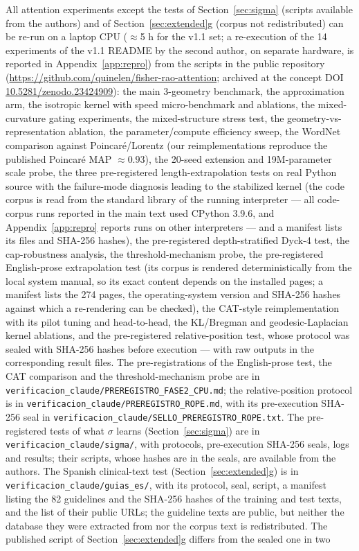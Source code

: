 \documentclass[11pt]{article}
\begin{document}
All attention experiments except the tests of Section~\ref{sec:sigma} (scripts available from the authors) and of Section~\ref{sec:extended}g (corpus not redistributed) can be re-run on a laptop CPU ($\approx$5 h for the v1.1 set; a re-execution of the 14 experiments of the v1.1 README by the second author, on separate hardware, is reported in Appendix~\ref{app:repro}) from the scripts in the public repository (\url{https://github.com/quinelen/fisher-rao-attention}; archived at the concept DOI \href{https://doi.org/10.5281/zenodo.23424909}{10.5281/zenodo.23424909}): the main 3-geometry benchmark, the approximation arm, the isotropic kernel with speed micro-benchmark and ablations, the mixed-curvature gating experiments, the mixed-structure stress test, the geometry-vs-representation ablation, the parameter/compute efficiency sweep, the WordNet comparison against Poincar\'e/Lorentz (our reimplementations reproduce the published Poincar\'e MAP $\approx 0.93$), the 20-seed extension and 19M-parameter scale probe, the three pre-registered length-extrapolation tests on real Python source with the failure-mode diagnosis leading to the stabilized kernel (the code corpus is read from the standard library of the running interpreter --- all code-corpus runs reported in the main text used CPython 3.9.6, and Appendix~\ref{app:repro} reports runs on other interpreters --- and a manifest lists its files and SHA-256 hashes), the pre-registered depth-stratified Dyck-4 test, the cap-robustness analysis, the threshold-mechanism probe, the pre-registered English-prose extrapolation test (its corpus is rendered deterministically from the local system manual, so its exact content depends on the installed pages; a manifest lists the 274 pages, the operating-system version and SHA-256 hashes against which a re-rendering can be checked), the CAT-style reimplementation with its pilot tuning and head-to-head, the KL/Bregman and geodesic-Laplacian kernel ablations, and the pre-registered relative-position test, whose protocol was sealed with SHA-256 hashes before execution --- with raw outputs in the corresponding result files. The pre-registrations of the English-prose test, the CAT comparison and the threshold-mechanism probe are in \texttt{verificacion\_claude/}\allowbreak\texttt{PREREGISTRO\_FASE2\_CPU.md}; the relative-position protocol is in \texttt{verificacion\_claude/}\allowbreak\texttt{PREREGISTRO\_ROPE.md}, with its pre-execution SHA-256 seal in \texttt{verificacion\_claude/}\allowbreak\texttt{SELLO\_PREREGISTRO\_ROPE.txt}. The pre-registered tests of what $\sigma$ learns (Section~\ref{sec:sigma}) are in \texttt{verificacion\_claude/}\allowbreak\texttt{sigma/}, with protocols, pre-execution SHA-256 seals, logs and results; their scripts, whose hashes are in the seals, are available from the authors. The Spanish clinical-text test (Section~\ref{sec:extended}g) is in \texttt{verificacion\_claude/}\allowbreak\texttt{guias\_es/}, with its protocol, seal, script, a manifest listing the 82 guidelines and the SHA-256 hashes of the training and test texts, and the list of their public URLs; the guideline texts are public, but neither the database they were extracted from nor the corpus text is redistributed. The published script of Section~\ref{sec:extended}g differs from the sealed one in two 
\end{document}
